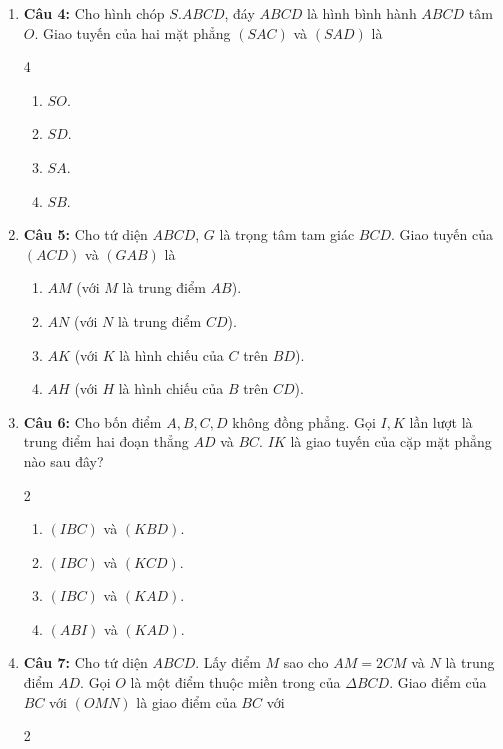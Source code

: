 \documentclass[12pt,a4paper]{extarticle}
\begin{document}
\begin{enumerate}
\begin{enumerate}
    \end{enumerate}
    \item \textbf{Câu 4:} Cho hình chóp $S.ABCD$, đáy $ABCD$ là hình bình hành $ABCD$ tâm $O$. Giao tuyến của hai mặt phẳng $(SAC)$ và $(SAD)$ là
    \begin{multicols}{4}
        \begin{enumerate}
            \item $SO$.
            \item $SD$.
            \item $SA$.
            \item $SB$.
        \end{enumerate}
    \end{multicols}
    \item \textbf{Câu 5:} Cho tứ diện $ABCD$, $G$ là trọng tâm tam giác $BCD$. Giao tuyến của $(ACD)$ và $(GAB)$ là
    \begin{enumerate}
        \item $AM$ (với $M$ là trung điểm $AB$).
        \item $AN$ (với $N$ là trung điểm $CD$).
        \item $AK$ (với $K$ là hình chiếu của $C$ trên $BD$).
        \item $AH$ (với $H$ là hình chiếu của $B$ trên $CD$).
    \end{enumerate}
    \item \textbf{Câu 6:} Cho bốn điểm $A,B,C,D$ không đồng phẳng. Gọi $I,K$ lần lượt là trung điểm hai đoạn thẳng $AD$ và $BC$. $IK$ là giao tuyến của cặp mặt phẳng nào sau đây?
    \begin{multicols}{2}
        \begin{enumerate}
            \item $(IBC)$ và $(KBD)$.
            \item $(IBC)$ và $(KCD)$.
            \item $(IBC)$ và $(KAD)$.
            \item $(ABI)$ và $(KAD)$.
        \end{enumerate}
    \end{multicols}
    \item \textbf{Câu 7:} Cho tứ diện $ABCD$. Lấy điểm $M$ sao cho $AM = 2CM$ và $N$ là trung điểm $AD$. Gọi $O$ là một điểm thuộc miền trong của $\Delta BCD$. Giao điểm của $BC$ với $(OMN)$ là giao điểm của $BC$ với
    \begin{multicols}{2}
        \begin{enumerate}

\end{enumerate}
\end{multicols}
\end{enumerate}
\end{document}

